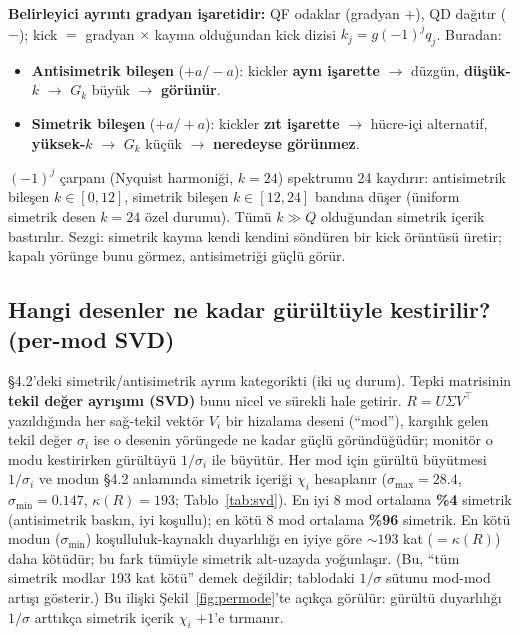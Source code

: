 \documentclass[twocolumn,a4paper,10pt]{article}
\begin{document}
\textbf{Belirleyici ayrıntı gradyan işaretidir:} QF odaklar (gradyan $+$), QD
dağıtır ($-$); kick $=$ gradyan $\times$ kayma olduğundan kick dizisi
$k_j=g(-1)^j q_j$. Buradan:
\begin{itemize}
\item \textbf{Antisimetrik bileşen} ($+a/-a$): kickler \textbf{aynı işarette}
  $\rightarrow$ düzgün, \textbf{düşük-$k$} $\rightarrow$ $G_k$ büyük $\rightarrow$
  \textbf{görünür}.
\item \textbf{Simetrik bileşen} ($+a/+a$): kickler \textbf{zıt işarette}
  $\rightarrow$ hücre-içi alternatif, \textbf{yüksek-$k$} $\rightarrow$ $G_k$
  küçük $\rightarrow$ \textbf{neredeyse görünmez}.
\end{itemize}
$(-1)^j$ çarpanı (Nyquist harmoniği, $k=24$) spektrumu 24 kaydırır: antisimetrik
bileşen $k\in[0,12]$, simetrik bileşen $k\in[12,24]$ bandına düşer (üniform
simetrik desen $k=24$ özel durumu). Tümü $k\gg Q$ olduğundan simetrik içerik
bastırılır. Sezgi: simetrik kayma kendi kendini söndüren bir kick örüntüsü
üretir; kapalı yörünge bunu görmez, antisimetriği güçlü görür.

\subsection{Hangi desenler ne kadar gürültüyle kestirilir? (per-mod SVD)}
\S4.2'deki simetrik/antisimetrik ayrım kategorikti (iki uç durum). Tepki
matrisinin \textbf{tekil değer ayrışımı (SVD)} bunu nicel ve sürekli hale
getirir. $R=U\Sigma V^\top$ yazıldığında her sağ-tekil vektör $V_i$ bir hizalama
deseni (``mod''), karşılık gelen tekil değer $\sigma_i$ ise o desenin yörüngede
ne kadar güçlü göründüğüdür; monitör o modu kestirirken gürültüyü $1/\sigma_i$
ile büyütür. Her mod için gürültü büyütmesi $1/\sigma_i$ ve modun \S4.2 anlamında
simetrik içeriği $\chi_i$ hesaplanır ($\sigma_{\max}=28.4$, $\sigma_{\min}=0.147$,
$\kappa(R)=193$; Tablo~\ref{tab:svd}). En iyi 8 mod ortalama \textbf{\%4} simetrik (antisimetrik
baskın, iyi koşullu); en kötü 8 mod ortalama \textbf{\%96} simetrik. En kötü
modun ($\sigma_{\min}$) koşulluluk-kaynaklı duyarlılığı en iyiye göre
$\sim 193$ kat ($=\kappa(R)$) daha kötüdür; bu fark tümüyle simetrik
alt-uzayda yoğunlaşır. (Bu, ``tüm simetrik modlar 193 kat kötü'' demek
değildir; tablodaki $1/\sigma$ sütunu mod-mod artışı gösterir.) Bu ilişki
Şekil~\ref{fig:permode}'te açıkça görülür: gürültü duyarlılığı $1/\sigma$
arttıkça simetrik içerik $\chi_i$ $+1$'e tırmanır.
\end{document}
